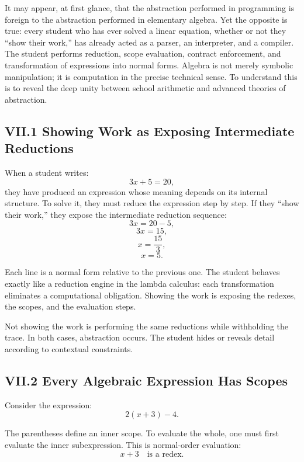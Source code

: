 \documentclass[11pt,letterpaper]{article}
\begin{document}
It may appear, at first glance, that the abstraction performed in programming is foreign to the abstraction performed in elementary algebra. Yet the opposite is true: every student who has ever solved a linear equation, whether or not they ``show their work,'' has already acted as a parser, an interpreter, and a compiler. The student performs reduction, scope evaluation, contract enforcement, and transformation of expressions into normal forms. Algebra is not merely symbolic manipulation; it is computation in the precise technical sense. To understand this is to reveal the deep unity between school arithmetic and advanced theories of abstraction.

\subsection{VII.1 Showing Work as Exposing Intermediate Reductions}

When a student writes:
\[
3x + 5 = 20,
\]
they have produced an expression whose meaning depends on its internal structure. To solve it, they must reduce the expression step by step. If they ``show their work,'' they expose the intermediate reduction sequence:
\[
3x = 20 - 5,
\]
\[
3x = 15,
\]
\[
x = \frac{15}{3},
\]
\[
x = 5.
\]

Each line is a normal form relative to the previous one. The student behaves exactly like a reduction engine in the lambda calculus: each transformation eliminates a computational obligation. Showing the work is exposing the redexes, the scopes, and the evaluation steps.

Not showing the work is performing the same reductions while withholding the trace. In both cases, abstraction occurs. The student hides or reveals detail according to contextual constraints.

\subsection{VII.2 Every Algebraic Expression Has Scopes}

Consider the expression:
\[
2(x + 3) - 4.
\]

The parentheses define an inner scope. To evaluate the whole, one must first evaluate the inner subexpression. This is normal-order evaluation:
\[
x + 3 \quad \text{is a redex.}
\]
\end{document}

